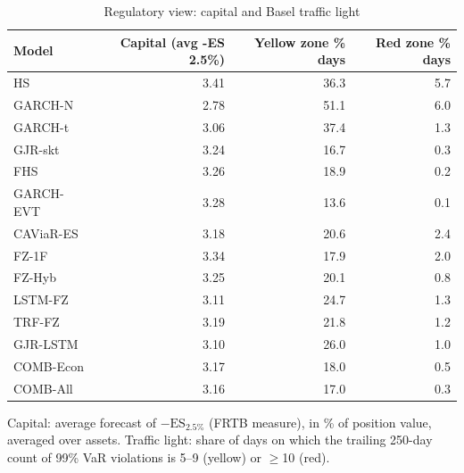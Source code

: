 \begin{table}[htbp]
\centering
\footnotesize
\caption{Regulatory view: capital and Basel traffic light}
\label{tab:reg}
\begin{tabular}{lrrr}
\toprule
Model & Capital (avg -ES 2.5\%) & Yellow zone \% days & Red zone \% days \\
\midrule
HS & 3.41 & 36.3 & 5.7 \\
GARCH-N & 2.78 & 51.1 & 6.0 \\
GARCH-t & 3.06 & 37.4 & 1.3 \\
GJR-skt & 3.24 & 16.7 & 0.3 \\
FHS & 3.26 & 18.9 & 0.2 \\
GARCH-EVT & 3.28 & 13.6 & 0.1 \\
CAViaR-ES & 3.18 & 20.6 & 2.4 \\
FZ-1F & 3.34 & 17.9 & 2.0 \\
FZ-Hyb & 3.25 & 20.1 & 0.8 \\
LSTM-FZ & 3.11 & 24.7 & 1.3 \\
TRF-FZ & 3.19 & 21.8 & 1.2 \\
GJR-LSTM & 3.10 & 26.0 & 1.0 \\
COMB-Econ & 3.17 & 18.0 & 0.5 \\
COMB-All & 3.16 & 17.0 & 0.3 \\
\bottomrule
\end{tabular}
\par\smallskip\parbox{\linewidth}{\scriptsize Capital: average forecast of $-\mathrm{ES}_{2.5\%}$ (FRTB measure), in \% of position value, averaged over assets. Traffic light: share of days on which the trailing 250-day count of 99\% VaR violations is 5--9 (yellow) or $\geq$10 (red).}
\end{table}